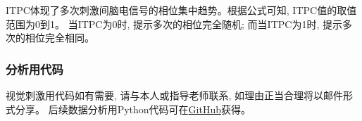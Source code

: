 
ITPC体现了多次刺激间脑电信号的相位集中趋势。根据公式可知, ITPC值的取值范围为0到1。
当ITPC为0时, 提示多次的相位完全随机; 而当ITPC为1时, 提示多次的相位完全相同。

\subsubsection{分析用代码}
视觉刺激用代码如有需要, 请与本人或指导老师联系, 如理由正当合理将以邮件形式分享。
后续数据分析用Python代码可在\href{https://github.com/ZhangJiayiLab/EEGAnalysis/releases/tag/v1.0}{GitHub}获得。
